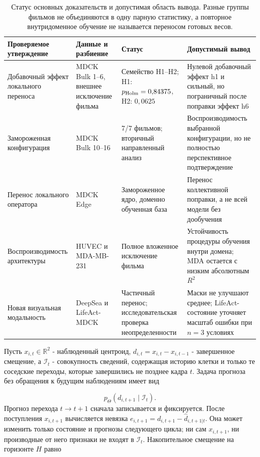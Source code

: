 \documentclass[11pt,a4paper]{article}
\begin{document}
\begin{table}[tb]
\centering
\caption{Статус основных доказательств и допустимая область вывода. Разные группы фильмов не объединяются в одну парную статистику, а повторное внутридоменное обучение не называется переносом готовых весов.}
\label{tab:evidence_status}
\small
\begin{tabularx}{\textwidth}{@{}L{0.24\textwidth} L{0.22\textwidth} L{0.20\textwidth} Y@{}}
\toprule
Проверяемое утверждение & Данные и разбиение & Статус & Допустимый вывод \\
\midrule
Добавочный эффект локального переноса & MDCK Bulk 1--6, внешнее исключение фильма & Семейство H1--H2; H1: $p_{\rm Holm}=0{,}84375$, H2: $0{,}0625$ & Нулевой добавочный эффект h1 и сильный, но пограничный после поправки эффект h6 \\
Замороженная конфигурация & MDCK Bulk 10--16 & 7/7 фильмов; вторичный направленный анализ & Воспроизводимость выбранной конфигурации, но не полностью перспективное подтверждение \\
Перенос локального оператора & MDCK Edge & Замороженное ядро, доменно обученная база & Перенос коллективной поправки, а не всей модели без дообучения \\
Воспроизводимость архитектуры & HUVEC и MDA-MB-231 & Полное вложенное исключение фильма & Устойчивость процедуры обучения внутри домена; MDA остается с низким абсолютным $R^2$ \\
Новая визуальная модальность & DeepSea и LifeAct-MDCK & Частичный перенос; исследовательская проверка неопределенности & Маски не улучшают среднее; LifeAct-состояние уточняет масштаб ошибки при $n=3$ условиях \\
\bottomrule
\end{tabularx}
\end{table}

Пусть $x_{i,t}\in\mathbb R^2$ - наблюденный центроид, $d_{i,t}=x_{i,t}-x_{i,t-1}$ - завершенное смещение, а $\mathcal I_t$ - совокупность сведений, содержащая историю клетки и только те соседские переходы, которые завершились не позднее кадра $t$. Задача прогноза без обращения к будущим наблюдениям имеет вид

\begin{equation}
p_\Theta(d_{i,t+1}\mid\mathcal I_t).
\end{equation}
Прогноз перехода $t\rightarrow t+1$ сначала записывается и фиксируется. После поступления $x_{i,t+1}$ вычисляется невязка $e_{i,t+1}=d_{i,t+1}-\widehat d_{i,t+1|t}$. Она может изменить только состояние и прогнозы следующего цикла; ни сам $x_{i,t+1}$, ни производные от него признаки не входят в $\mathcal I_t$. Накопительное смещение на горизонте $H$ равно
\end{document}
